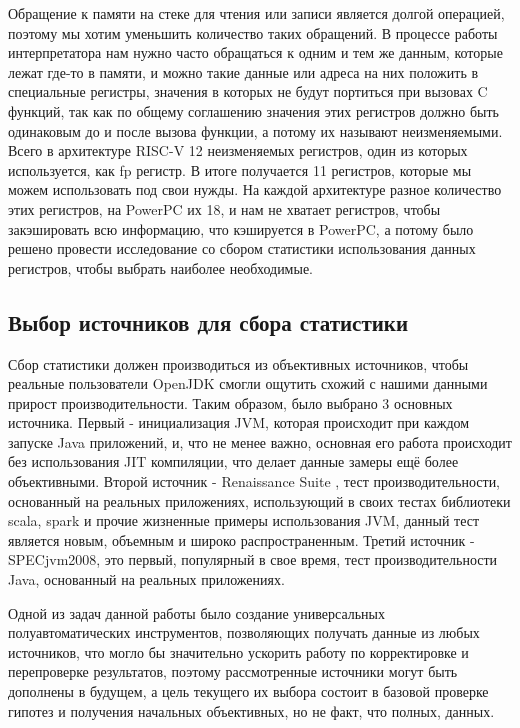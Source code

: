\newpage
{}

Обращение к памяти на стеке для чтения или записи является долгой операцией, поэтому мы хотим уменьшить количество таких обращений. В процессе работы интерпретатора нам нужно часто обращаться к одним и тем же данным, которые лежат где-то в памяти, и можно такие данные или адреса на них положить в специальные регистры, значения в которых не будут портиться при вызовах C функций, так как по общему соглашению значения этих регистров должно быть одинаковым до и после вызова функции, а потому их называют неизменяемыми. Всего в архитектуре RISC-V 12 неизменяемых регистров, один из которых используется, как fp регистр. В итоге получается 11 регистров, которые мы можем использовать под свои нужды. На каждой архитектуре разное количество этих регистров, на PowerPC их 18, и нам не хватает регистров, чтобы закэшировать всю информацию, что кэшируется в PowerPC, а потому было решено провести исследование со сбором статистики использования данных регистров, чтобы выбрать наиболее необходимые.



\subsection{Выбор источников для сбора статистики}

Сбор статистики должен производиться из объективных источников, чтобы реальные пользователи OpenJDK смогли ощутить схожий с нашими данными прирост производительности. Таким образом, было выбрано 3 основных источника.
Первый - инициализация JVM, которая происходит при каждом запуске Java приложений, и, что не менее важно, основная его работа происходит без использования JIT компиляции, что делает данные замеры ещё более объективными.
Второй источник - Renaissance Suite \cite{renaissance}, тест производительности, основанный на реальных приложениях, использующий в своих тестах библиотеки scala, spark и прочие жизненные примеры использования JVM, данный тест является новым, объемным и широко распространенным.
Третий источник - SPECjvm2008, это первый, популярный в свое время, тест производительности Java, основанный на реальных приложениях.

Одной из задач данной работы было создание универсальных полуавтоматических инструментов, позволяющих получать данные из любых источников, что могло бы значительно ускорить работу по корректировке и перепроверке результатов, поэтому рассмотренные источники могут быть дополнены в будущем, а цель текущего их выбора состоит в базовой проверке гипотез и получения начальных объективных, но не факт, что полных, данных. 



